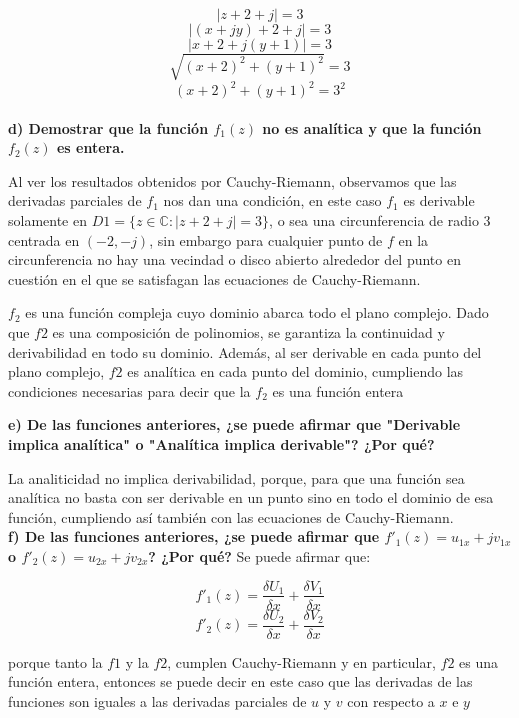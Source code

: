 \documentclass[12pt]{report}
\begin{document}
$$|z+2+j|=3$$
$$|(x+jy)+2+j|=3$$
$$|x+2+j(y+1)|=3$$
$$\sqrt{(x+2)^2+(y+1)^2}=3$$
$$(x+2)^2+(y+1)^2=3^2$$\\

\textbf{d) Demostrar que la función $f_1(z)$ no es analítica y que la función $f_2(z)$ es entera.}

Al ver los resultados obtenidos por Cauchy-Riemann, observamos que las derivadas parciales de $f_1$ nos dan una condición, en este caso $f_1$ es derivable solamente
en $D1 = \{z \in \mathbb{C} : |z + 2 + j| = 3\}$, o sea una circunferencia de radio $3$ centrada en $(-2, -j)$, sin embargo para cualquier punto de $f$ en la
circunferencia no hay una vecindad o disco abierto alrededor del punto en cuestión en el que se satisfagan las ecuaciones de Cauchy-Riemann.

$f_2$ es una función compleja cuyo dominio abarca todo el plano complejo. Dado que $f2$ es una composición de polinomios, se garantiza la continuidad y
derivabilidad en todo su dominio. Además, al ser derivable en cada punto del plano complejo, $f2$ es analítica en cada punto del dominio, cumpliendo las
condiciones necesarias para decir que la $f_2$ es una función entera

\textbf{e) De las funciones anteriores, ¿se puede afirmar que "Derivable implica analítica" o "Analítica implica derivable"? ¿Por qué?}

La analiticidad no implica derivabilidad, porque, para que una función sea analítica no basta con ser derivable en un punto sino en todo el dominio de esa
función, cumpliendo así también con las ecuaciones de Cauchy-Riemann.\\

\textbf{f) De las funciones anteriores, ¿se puede afirmar que $f'_1(z) = u_{1x} + jv_{1x}$ o $f'_2(z) = u_{2x} + jv_{2x}$? ¿Por qué?}
Se puede afirmar que:

$$f'_1(z)=\frac{\delta U_1}{\delta x}+\frac{\delta V_1}{\delta x}$$
$$f'_2(z)=\frac{\delta U_2}{\delta x}+\frac{\delta V_2}{\delta x}$$

porque tanto la $f1$ y la $f2$, cumplen Cauchy-Riemann y en particular, $f2$ es una función entera, entonces se puede decir en este caso que las derivadas de las
funciones son iguales a las derivadas parciales de $u$ y $v$ con respecto a $x$ e $y$

\chapter{}%
\end{document}
